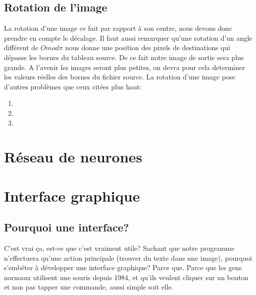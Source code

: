 \documentclass[]{report}
\begin{document}
        \section{Rotation de l'image}
        \label{principe}
        La rotation d'une image ce fait par rapport à son centre, nous devons donc prendre en compte le décalage.
        Il faut aussi remarquer qu'une rotation d'un angle différent de $O mod \pi$ nous donne une position des
        pixels de destinations qui dépasse les bornes du tableau source. De ce fait notre image
        de sortie sera plus grande. A l'avenir les images seront plus petites, on devra pour cela determiner les valeurs réelles
        des bornes du fichier source.
        La rotation d'une image pose d'autres problèmes que ceux citées plus haut:
        \begin{enumerate}
          \item
          \item
          \item
        \end{enumerate}


	\chapter{R\'eseau de neurones} %
	\label{cha:r'eseau_de_neurones}




	\chapter{Interface graphique} %
	\label{cha:interface_graphique}
		\section{Pourquoi une interface?} %
		\label{sec:pourquoi_une_interface_}
		C'est vrai \c ca, est-ce que c'est vraiment utile? Sachant que notre programme n'effectuera qu'une action principale (trouver du texte dans une image), pourquoi s'emb\^eter \`a d\'evelopper une interface graphique? Parce que. Parce que les gens normaux utilisent une souris depuis 1984, et qu'ils veulent cliquer sur un bouton et non pas tapper une commande, aussi simple soit elle.
		
\end{document}
